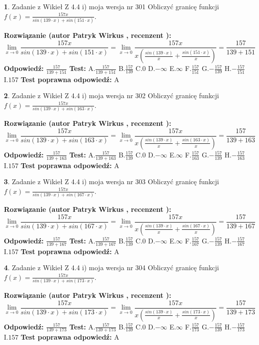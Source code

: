 \documentclass[12pt, a4paper]{article}
\theoremstyle{definition} %
\newtheorem{zad}{}
\newcommand{\zadStart}[1]{\begin{zad}#1\newline}
\newcommand{\zadStop}{\end{zad}}
\newcommand{\rozwStart}[2]{\noindent \textbf{Rozwiązanie (autor #1 , recenzent #2): }\newline}
\newcommand{\rozwStop}{\newline}
\newcommand{\odpStart}{\noindent \textbf{Odpowiedź:}\newline}
\newcommand{\odpStop}{\newline}
\newcommand{\testStart}{\noindent \textbf{Test:}\newline}
\newcommand{\testStop}{\newline}
\newcommand{\kluczStart}{\noindent \textbf{Test poprawna odpowiedź:}\newline}
\newcommand{\kluczStop}{\newline}
\begin{document}
\zadStart{Zadanie z Wikieł Z 4.4 i) moja wersja nr 301}
Obliczyć granicę funkcji $f(x)=\frac{157x}{sin(139\cdot x) +sin(151\cdot x)}$.
\zadStop
\rozwStart{Patryk Wirkus}{}
$$\lim\limits_{x\to 0}\frac{157x}{sin(139\cdot x) +sin(151\cdot x)}=\lim\limits_{x\to 0}\frac{157x}{x(\frac{sin(139\cdot x)}{x}+\frac{sin(151\cdot x)}{x})}=\frac{157}{139+151}$$
\rozwStop
\odpStart
$\frac{157}{139+151}$
\odpStop
\testStart
A.$\frac{157}{139+151}$
B.$\frac{157}{139}$
C.$0$
D.$-\infty$
E.$\infty$
F.$\frac{157}{151}$
G.$-\frac{157}{139}$
H.$-\frac{157}{151}$
I.$157$
\testStop
\kluczStart
A
\kluczStop



\zadStart{Zadanie z Wikieł Z 4.4 i) moja wersja nr 302}
Obliczyć granicę funkcji $f(x)=\frac{157x}{sin(139\cdot x) +sin(163\cdot x)}$.
\zadStop
\rozwStart{Patryk Wirkus}{}
$$\lim\limits_{x\to 0}\frac{157x}{sin(139\cdot x) +sin(163\cdot x)}=\lim\limits_{x\to 0}\frac{157x}{x(\frac{sin(139\cdot x)}{x}+\frac{sin(163\cdot x)}{x})}=\frac{157}{139+163}$$
\rozwStop
\odpStart
$\frac{157}{139+163}$
\odpStop
\testStart
A.$\frac{157}{139+163}$
B.$\frac{157}{139}$
C.$0$
D.$-\infty$
E.$\infty$
F.$\frac{157}{163}$
G.$-\frac{157}{139}$
H.$-\frac{157}{163}$
I.$157$
\testStop
\kluczStart
A
\kluczStop



\zadStart{Zadanie z Wikieł Z 4.4 i) moja wersja nr 303}
Obliczyć granicę funkcji $f(x)=\frac{157x}{sin(139\cdot x) +sin(167\cdot x)}$.
\zadStop
\rozwStart{Patryk Wirkus}{}
$$\lim\limits_{x\to 0}\frac{157x}{sin(139\cdot x) +sin(167\cdot x)}=\lim\limits_{x\to 0}\frac{157x}{x(\frac{sin(139\cdot x)}{x}+\frac{sin(167\cdot x)}{x})}=\frac{157}{139+167}$$
\rozwStop
\odpStart
$\frac{157}{139+167}$
\odpStop
\testStart
A.$\frac{157}{139+167}$
B.$\frac{157}{139}$
C.$0$
D.$-\infty$
E.$\infty$
F.$\frac{157}{167}$
G.$-\frac{157}{139}$
H.$-\frac{157}{167}$
I.$157$
\testStop
\kluczStart
A
\kluczStop



\zadStart{Zadanie z Wikieł Z 4.4 i) moja wersja nr 304}
Obliczyć granicę funkcji $f(x)=\frac{157x}{sin(139\cdot x) +sin(173\cdot x)}$.
\zadStop
\rozwStart{Patryk Wirkus}{}
$$\lim\limits_{x\to 0}\frac{157x}{sin(139\cdot x) +sin(173\cdot x)}=\lim\limits_{x\to 0}\frac{157x}{x(\frac{sin(139\cdot x)}{x}+\frac{sin(173\cdot x)}{x})}=\frac{157}{139+173}$$
\rozwStop
\odpStart
$\frac{157}{139+173}$
\odpStop
\testStart
A.$\frac{157}{139+173}$
B.$\frac{157}{139}$
C.$0$
D.$-\infty$
E.$\infty$
F.$\frac{157}{173}$
G.$-\frac{157}{139}$
H.$-\frac{157}{173}$
I.$157$
\testStop
\kluczStart
A
\kluczStop
\end{document}
